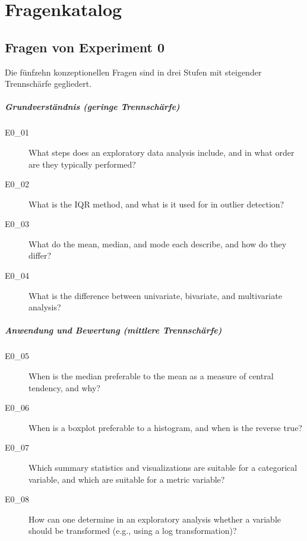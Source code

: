 \appendix

\chapter{Fragenkatalog}
\label{app:fragenkatalog}

\section{Fragen von Experiment 0}
 
Die fünfzehn konzeptionellen Fragen sind in drei Stufen mit steigender
Trennschärfe gegliedert.
 
\paragraph{Grundverständnis (geringe Trennschärfe)}
 
\begin{description}
\item[E0\_01] What steps does an exploratory data analysis include, and in what
  order are they typically performed?
\item[E0\_02] What is the IQR method, and what is it used for in outlier
  detection?
\item[E0\_03] What do the mean, median, and mode each describe, and how do they
  differ?
\item[E0\_04] What is the difference between univariate, bivariate, and
  multivariate analysis?
\end{description}
 
\paragraph{Anwendung und Bewertung (mittlere Trennschärfe)}
 
\begin{description}
\item[E0\_05] When is the median preferable to the mean as a measure of central
  tendency, and why?
\item[E0\_06] When is a boxplot preferable to a histogram, and when is the
  reverse true?
\item[E0\_07] Which summary statistics and visualizations are suitable for a
  categorical variable, and which are suitable for a metric variable?
\item[E0\_08] How can one determine in an exploratory analysis whether a
  variable should be transformed (e.g., using a log transformation)?
\end{description}
 
